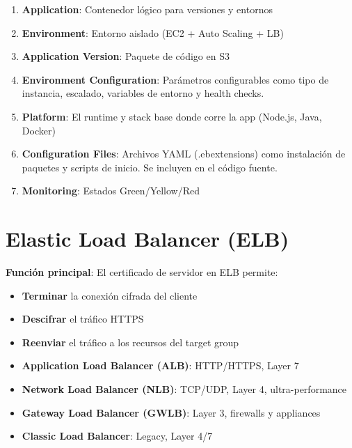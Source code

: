 \documentclass[12pt,a4paper]{report}
\begin{document}
\begin{enumerate}
    \item \textbf{Application}: Contenedor lógico para versiones y entornos
    \item \textbf{Environment}: Entorno aislado (EC2 + Auto Scaling + LB)
    \item \textbf{Application Version}: Paquete de código en S3
    \item \textbf{Environment Configuration}: Parámetros configurables como tipo de instancia, escalado, variables de entorno y health checks.
    \item \textbf{Platform}: El runtime y stack base donde corre la app (Node.js, Java, Docker)
    \item \textbf{Configuration Files}: Archivos YAML (.ebextensions) como instalación de paquetes y scripts de inicio. Se incluyen en el código fuente.
    \item \textbf{Monitoring}: Estados Green/Yellow/Red
\end{enumerate}

\section{Elastic Load Balancer (ELB)}

\begin{conceptbox}
\textbf{Función principal}: El certificado de servidor en ELB permite:
\begin{itemize}
    \item \textbf{Terminar} la conexión cifrada del cliente
    \item \textbf{Descifrar} el tráfico HTTPS
    \item \textbf{Reenviar} el tráfico a los recursos del target group
\end{itemize}
\end{conceptbox}

\begin{awsbox}
\begin{itemize}
    \item \textbf{Application Load Balancer (ALB)}: HTTP/HTTPS, Layer 7
    \item \textbf{Network Load Balancer (NLB)}: TCP/UDP, Layer 4, ultra-performance
    \item \textbf{Gateway Load Balancer (GWLB)}: Layer 3, firewalls y appliances
    \item \textbf{Classic Load Balancer}: Legacy, Layer 4/7
\end{itemize}
\end{awsbox}
\end{document}
